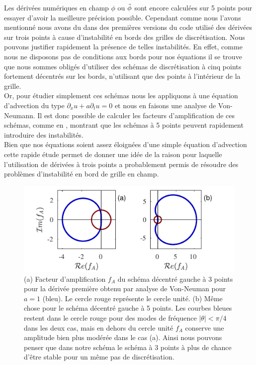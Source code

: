 \documentclass[10.5pt]{article}
\begin{document}
\begin{multicols}{2}
Les dérivées numériques en champ $\phi$ ou $\tilde{\phi}$ sont encore calculées sur 5 points pour essayer d'avoir la meilleure  précision possible. Cependant comme nous l'avons mentionné nous avons du dans des premières versions du code utilisé des dérivées sur trois points à cause d'instabilité en bords des grilles de discrétisation. Nous pouvons justifier rapidement la présence de telles instabilités. En effet, comme nous ne disposons pas de conditions aux bords pour nos équations il se trouve que nous sommes obligés d'utiliser des schémas de discrétisation à cinq points fortement décentrés sur les bords, n'utilisant que des points à l'intérieur de la grille.\\


Or, pour étudier simplement ces schémas nous les appliquons à une équation d'advection du type $\partial_x u + a \partial_t u = 0$ et nous en faisons une analyse de Von-Neumann. Il est donc possible de calculer les facteurs d'amplification de ces schémas, comme en , montrant que les schémas à 5 points peuvent rapidement introduire des instabilités.\\

Bien que nos équations soient assez éloignées d'une simple équation d'advection cette rapide étude permet de donner une idée de la raison pour laquelle l'utilisation de dérivées à trois points a probablement permis de résoudre des problèmes d'instabilité en bord de grille en champ.

\begin{figure}[H]
\begin{center}
	\includegraphics[width=0.95\columnwidth]{FacAmp.pdf}
\end{center}
\caption{(a) Facteur d'amplification $f_A$ du schéma décentré gauche à 3 points pour la dérivée première obtenu par analyse de Von-Neuman pour $a=1$ (bleu). Le cercle rouge représente le cercle unité. (b) Même chose pour le schéma décentré gauche à 5 points. Les courbes bleues restent dans le cercle rouge pour des modes de fréquence $|\theta| < \pi/4$ dans les deux cas, mais en dehors du cercle unité $f_A$ conserve une amplitude bien plus modérée dans le cas (a). Ainsi nous pouvons penser que dans notre schéma le schéma à 3 points à plus de chance d'être stable pour un même pas de discrétisation.}
\label{fig:FacAmp}
\end{figure}



\end{multicols}
\end{document}
